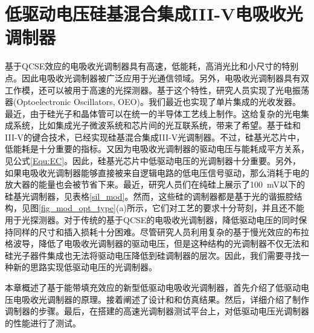 \chapter{低驱动电压硅基混合集成III-V电吸收光调制器}
基于QCSE效应的电吸收光调制器具有高速，低能耗，高消光比和小尺寸的特别点\cite{tang2012energy, fukano2006very}。因此电吸收光调制器被广泛应用于光通信领域。另外，电吸收光调制器具有双工作模，还可以被用于高速的光探测器\cite{welstand1996dual}。基于这个特性，研究人员实现了光电振荡器(Optoelectronic Oscillators, OEO)\cite{zhou2014compact}。我们最近也实现了单片集成的光收发器\cite{chen2016wavelength}。最近，由于硅光子和晶体管可以在统一的半导体工艺线上制作。这给复杂的光电集成系统，比如集成光子微波系统\cite{Marpaung2013integrated}和芯片间的光互联系统\cite{sun2015single}，带来了希望。基于硅和III-V的键合技术，已经实现硅基混合集成III-V光调制器\cite{kuo2008high,tang201150,tang2012over,tang2012energy,chen2011forty,Srinivasan2012micro,fu20155}。不过，硅基光芯片中，低能耗是十分重要的指标。又因为电吸收光调制器的驱动电压与能耗成平方关系，见公式\ref{Equ:EC}。因此，硅基光芯片中低驱动电压的光调制器十分重要。另外，如果电吸收光调制器能够直接被来自逻辑电路的低电压信号驱动，那么消耗于电的放大器的能量也会被节省下来。最近，研究人员们在纯硅上展示了100~mV以下的硅基光调制器，见表格\ref{sil_mod}。然而，这些硅的调制器都是基于光的谐振腔结构，见图\ref{fig_mod_opt_type}(a)所示，它们对工艺的要求十分苛刻，并且还不能用于光探测器。对于传统的基于QCSE的电吸收光调制器，降低驱动电压的同时保持同样的尺寸和插入损耗十分困难。尽管研究人员利用复杂的基于慢光效应的布拉格波导\cite{gulow-voltage2013}，降低了电吸收光调制器的驱动电压，但是这种结构的光调制器不仅无法和硅光子器件集成也无法将驱动电压降低到硅调制器的层次。因此，我们需要寻找一种新的思路实现低驱动电压的光调制器。

本章概述了基于能带填充效应的新型低驱动电吸收光调制器，首先介绍了低驱动电压电吸收光调制器的原理。接着阐述了设计和和仿真结果。然后，详细介绍了制作调制器的步骤。最后，在搭建的高速光调制器测试平台上，对低驱动电压光调制器的性能进行了测试。

